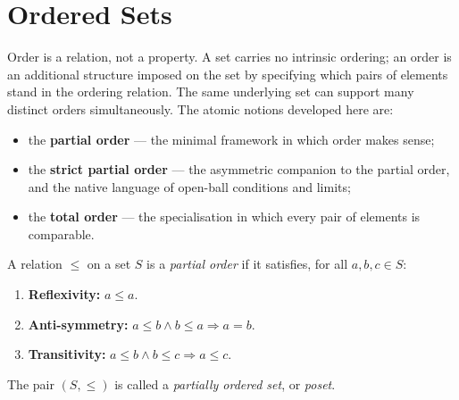 
\section{Ordered Sets}
\label{sec:ordered-sets}

\begin{tcolorbox}[
  colback=gray!6,
  colframe=gray!40,
  arc=2pt,
  left=8pt, right=8pt, top=6pt, bottom=6pt,
  title={\small\textbf{Toolkit: Ordered Sets}},
  fonttitle=\small\bfseries
]
Order is a relation, not a property.  A set carries no intrinsic ordering;
an order is an additional structure imposed on the set by specifying which
pairs of elements stand in the ordering relation.  The same underlying set
can support many distinct orders simultaneously.  The atomic notions
developed here are:
\begin{itemize}
  \item the \textbf{partial order} — the minimal framework in which order
        makes sense;
  \item the \textbf{strict partial order} — the asymmetric companion to the
        partial order, and the native language of open-ball conditions and
        limits;
  \item the \textbf{total order} — the specialisation in which every pair of
        elements is comparable.
\end{itemize}
\end{tcolorbox}


\begin{tcolorbox}[colback=defbox, colframe=defborder, arc=2pt,
  left=6pt, right=6pt, top=4pt, bottom=4pt,
  title={\small\textbf{Definition (Partial Order)}},
  fonttitle=\small\bfseries]
\begin{definition}
\label{def:partial-order}
A relation $\leq$ on a set $S$ is a \emph{partial order} if it satisfies,
for all $a, b, c \in S$:
\begin{enumerate}
  \item \textbf{Reflexivity:} $a \leq a$.
  \item \textbf{Anti-symmetry:} $a \leq b \land b \leq a \Longrightarrow a = b$.
  \item \textbf{Transitivity:} $a \leq b \land b \leq c \Longrightarrow a \leq c$.
\end{enumerate}
The pair $(S, \leq)$ is called a \emph{partially ordered set}, or \emph{poset}.
\end{definition}
\end{tcolorbox}

